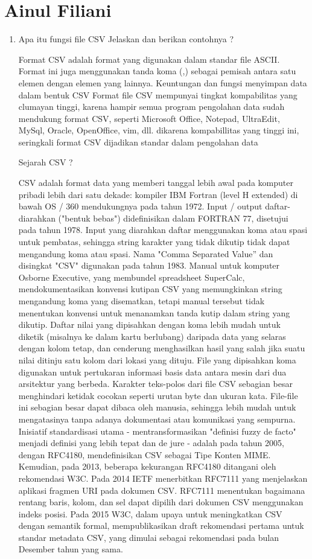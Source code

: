 \section{Ainul Filiani}
\begin{enumerate}


\item Apa itu fungsi file CSV Jelaskan dan berikan contohnya ?

Format CSV adalah format yang digunakan dalam standar file ASCII. Format ini juga menggunakan tanda koma (,) sebagai pemisah antara satu elemen dengan elemen yang lainnya.
Keuntungan dan fungsi menyimpan data dalam bentuk CSV
Format file CSV mempunyai  tingkat kompabilitas yang clumayan tinggi, karena hampir semua program pengolahan data sudah mendukung format CSV, seperti Microsoft Office, Notepad, UltraEdit, MySql, Oracle, OpenOffice, vim, dll. dikarena kompabillitas yang tinggi ini, seringkali format CSV dijadikan standar dalam pengolahan data

Sejarah CSV ?

CSV adalah format data yang memberi tanggal lebih awal pada komputer pribadi lebih dari satu dekade: kompiler IBM Fortran (level H extended) di bawah OS / 360 mendukungnya pada tahun 1972. Input / output daftar-diarahkan ("bentuk bebas") didefinisikan dalam FORTRAN 77, disetujui pada tahun 1978. Input yang diarahkan daftar menggunakan koma atau spasi untuk pembatas, sehingga string karakter yang tidak dikutip tidak dapat mengandung koma atau spasi. 
Nama "Comma Separated Value” dan disingkat "CSV" digunakan pada tahun 1983.  Manual untuk komputer Osborne Executive, yang membundel spreadsheet SuperCalc, mendokumentasikan konvensi kutipan CSV yang memungkinkan string mengandung koma yang disematkan, tetapi manual tersebut tidak menentukan konvensi untuk menanamkan tanda kutip dalam string yang dikutip.
Daftar nilai yang dipisahkan dengan koma lebih mudah untuk diketik (misalnya ke dalam kartu berlubang) daripada data yang selaras dengan kolom tetap, dan cenderung menghasilkan hasil yang salah jika suatu nilai ditinju satu kolom dari lokasi yang dituju.
File yang dipisahkan koma digunakan untuk pertukaran informasi basis data antara mesin dari dua arsitektur yang berbeda. Karakter teks-polos dari file CSV sebagian besar menghindari ketidak cocokan seperti urutan byte dan ukuran kata. File-file ini sebagian besar dapat dibaca oleh manusia, sehingga lebih mudah untuk mengatasinya tanpa adanya dokumentasi atau komunikasi yang sempurna.
Inisiatif standardisasi utama - mentransformasikan "definisi fuzzy de facto" menjadi definisi yang lebih tepat dan de jure - adalah pada tahun 2005, dengan RFC4180, mendefinisikan CSV sebagai Tipe Konten MIME. Kemudian, pada 2013, beberapa kekurangan RFC4180 ditangani oleh rekomendasi W3C. 
Pada 2014 IETF menerbitkan RFC7111 yang menjelaskan aplikasi fragmen URI pada dokumen CSV. RFC7111 menentukan bagaimana rentang baris, kolom, dan sel dapat dipilih dari dokumen CSV menggunakan indeks posisi.
Pada 2015 W3C, dalam upaya untuk meningkatkan CSV dengan semantik formal, mempublikasikan draft rekomendasi pertama untuk standar metadata CSV, yang dimulai sebagai rekomendasi pada bulan Desember tahun yang sama.


\end{enumerate}

